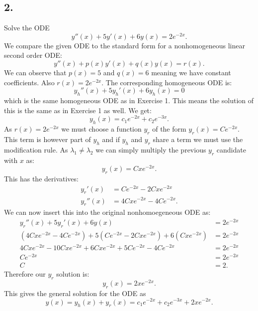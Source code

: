 \subsection*{2.} Solve the ODE
\[ 
y''(x) + 5y'(x) + 6y(x) = 2e^{-2x}
.\]
\bigbreak
We compare the given ODE to the standard form for a nonhomogeneous linear second order ODE:
\[ 
y''(x) + p(x) y'(x) + q(x) y(x) = r(x)
.\]
We can observe that $p(x) = 5$ and $q(x) = 6$ meaning we have constant coefficients. Also $r(x) = 2e^{-2x}$. The corresponding homogeneous ODE is:
\[ 
y_h''(x) + 5y_h'(x) + 6y_h(x) = 0
\]
which is the same homogeneous ODE as in Exercise 1. This means the solution of this is the same as in Exercise 1 as well. We get:
\[ 
y_h(x) = c_1 e^{-2x} + c_2 e^{-3x}
.\]
As $r(x) = 2e^{-2x}$ we must choose a function $y_r$ of the form $y_r(x) = C e^{-2x}$. This term is however part of $y_h$ and if $y_h$ and $y_r$ share a term we must use the modification rule. As $\lambda_1 \neq \lambda_2$ we can simply multiply the previous $y_r$ candidate with $x$ as:
\[ 
y_r(x) = C x e^{-2x}
.\]
This has the derivatives:
\begin{align*}
  y_r'(x) &= C e^{-2x} - 2C x e^{-2x} \\
  y_r''(x) &= 4C x e^{-2x} - 4 C e^{-2x}
.\end{align*}
We can now insert this into the original nonhomoegeneous ODE as:
\begin{align*}
  y_r''(x) + 5 y_r'(x) + 6 y(x) &= 2e^{-2x} \\
  \left( 4 C x e^{-2x} - 4 C e^{-2x} \right) + 5 \left( C e^{-2x} - 2 C x e^{-2x} \right) + 6 \left( C x e^{-2x} \right) &= 2e^{-2x} \\
  4 C x e^{-2x} - 10 C x e^{-2x} + 6 C x e^{-2x} + 5 C e^{-2x} - 4 C e^{-2x} &= 2e^{-2x} \\
  C e^{-2x} &= 2 e^{-2x} \\
  C &= 2
.\end{align*}
Therefore our $y_r$ solution is:
\[ 
y_r(x) = 2 x e^{-2x}
.\]
This gives the general solution for the ODE as
\[ 
y(x) = y_h(x) + y_r(x) = c_1 e^{-2x} + c_2 e^{-3x} + 2 x e^{-2x}
.\]

